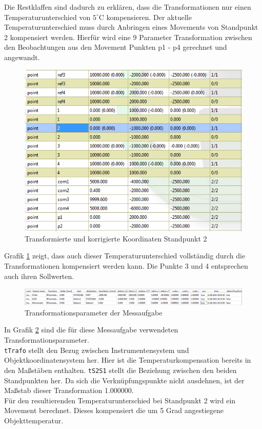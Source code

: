 Die Restklaffen sind dadurch zu erklären, dass die Transformationen nur einen Temperaturunterschied von $5^\circ\text{C}$ kompensieren. Der aktuelle Temperaturunterschied muss durch Anbringen eines Movements von Standpunkt 2 kompensiert werden. Hierfür wird eine 9 Parameter Transformation zwischen den Beobachtungen aus den Movement Punkten p1 - p4 gerechnet und angewandt.

\begin{figure}[H]
\label{fig:s2Movement}
\centering
	\includegraphics[scale=2.0]{bilder/Testmessung/zylinder/3u4mitMovement}
	\caption{Transformierte und korrigierte Koordinaten Standpunkt 2}
\end{figure}

Grafik \ref{fig:s2Movement} zeigt, dass auch dieser Temperaturunterschied vollständig durch die Transformationen kompensiert werden kann. Die Punkte 3 und 4 entsprechen auch ihren Sollwerten.

\begin{figure}[H]
\label{fig:transformationen}
\centering
	\includegraphics[scale=1.5]{bilder/Testmessung/zylinder/transformationen}
	\caption{Transformationsparameter der Messaufgabe}
\end{figure}

In Grafik \ref{fig:transformationen} sind die für diese Messaufgabe verwendeten Transformationsparameter.\\
\texttt{tTrafo} stellt den Bezug zwischen Instrumentensystem und Objektkoordinatensystem her. Hier ist die Temperaturkompensation bereits in den Maßstäben enthalten. \texttt{tS2S1} stellt die Beziehung zwischen den beiden Standpunkten her. Da sich die Verknüpfungspunkte nicht ausdehnen, ist der Maßstab dieser Transformation 1.000000. \\
Für den resultierenden Temperaturunterschied bei Standpunkt 2 wird ein Movement berechnet. Dieses kompensiert die um 5 Grad angestiegene Objekttemperatur.\\

